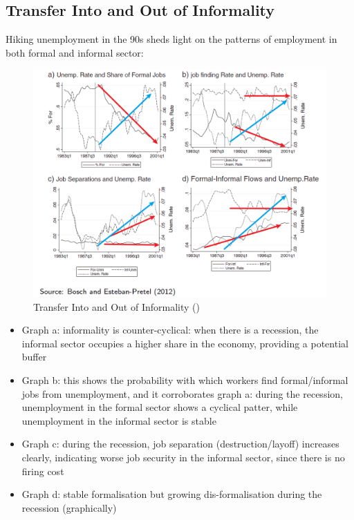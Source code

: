             \subsection{Transfer Into and Out of Informality}
                Hiking unemployment in the 90s sheds light on the patterns of employment in both formal and informal sector:
                \begin{figure}[H]
                    \centering
                    \includegraphics[width=5.5in]{images/ch5/ins and outs of informality.png}
                    \caption{Transfer Into and Out of Informality (\cite{bosch_job_2012})}
                \end{figure}
                \begin{itemize}
                    \item Graph a: informality is counter-cyclical: when there is a recession, the informal sector occupies a higher share in the economy, providing a potential buffer
                    \item Graph b: this shows the probability with which workers find formal/informal jobs from unemployment, and it corroborates graph a: during the recession, unemployment in the formal sector shows a cyclical patter, while unemployment in the informal sector is stable
                    \item Graph c: during the recession, job separation (destruction/layoff) increases clearly, indicating worse job security in the informal sector, since there is no firing cost
                    \item Graph d: stable formalisation but growing dis-formalisation during the recession (graphically)
                \end{itemize}
            
